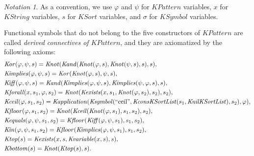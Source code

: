 \documentclass[UTF8,11pt]{article}
\newcounter{thmcounter}
\theoremstyle{plain}
\theoremstyle{definition}
\theoremstyle{remark}
\newtheorem{notation}   [thmcounter]{Notation}
\newcommand{\KString}{\mathit{KString}}
\newcommand{\KSort}{\mathit{KSort}}
\newcommand{\KSymbol}{\mathit{KSymbol}}
\newcommand{\Ksymbol}{\mathit{Ksymbol}}
\newcommand{\KnilKSortList}{\mathit{KnilKSortList}}
\newcommand{\KconsKSortList}{\mathit{KconsKSortList}}
\newcommand{\KPattern}{\mathit{KPattern}}
\newcommand{\Kvariable}{\mathit{Kvariable}}
\newcommand{\Kand}{\mathit{Kand}}
\newcommand{\Kor}{\mathit{Kor}}
\newcommand{\Kimplies}{\mathit{Kimplies}}
\newcommand{\Kiff}{\mathit{Kiff}}
\newcommand{\Knot}{\mathit{Knot}}
\newcommand{\Kapplication}{\mathit{Kapplication}}
\newcommand{\Kexists}{\mathit{Kexists}}
\newcommand{\Kforall}{\mathit{Kforall}}
\newcommand{\Kequals}{\mathit{Kequals}}
\newcommand{\Kin}{\mathit{Kin}}
\newcommand{\Ktop}{\mathit{Ktop}}
\newcommand{\Kbottom}{\mathit{Kbottom}}
\newcommand{\Kfloor}{\mathit{Kfloor}}
\newcommand{\Kceil}{\mathit{Kceil}}
\newcommand{\quot}[1]{\mathrm{``#1"}}
\begin{document}
\begin{notation}\label{notation:variables-about-KPattern}
	As a convention, we use $\varphi$ and $\psi$ for $\KPattern$ variables, $x$ for $\KString$ variables, $s$ for $\KSort$ variables, and $\sigma$ for $\KSymbol$ variables. 
\end{notation}

Functional symbols that do not belong to the five constructors of $\KPattern$ are called \emph{derived connectives of $\KPattern$}, and they are axiomatized by the following axioms:
\begin{align*}
  & \Kor(\varphi, \psi, s) = \Knot(\Kand(\Knot(\varphi, s), \Knot(\psi, s), s), s),
  \\
  & \Kimplies(\varphi, \psi, s) = \Kor(\Knot(\varphi, s), \psi, s),
  \\
  & \Kiff(\varphi, \psi, s) = \Kand(\Kimplies(\varphi, \psi, s), \Kimplies(\psi, \varphi, s), s),
  \\
  & \Kforall(x, s_1, \varphi, s_2) = \Knot(\Kexists(x, s_1, \Knot(\varphi, s_2), s_2), s_2),
  \\
  & \Kceil(\varphi, s_1, s_2) =
    \Kapplication(\Ksymbol(\quot{ceil}, \KconsKSortList(s_1, \KnilKSortList), s_2), \varphi),
  \\
  & \Kfloor(\varphi, s_1, s_2) = \Knot(\Kceil(\Knot(\varphi, s_1), s_1, s_2), s_2),
  \\
  & \Kequals(\varphi, \psi, s_1, s_2) = \Kfloor(\Kiff(\varphi, \psi, s_1), s_1, s_2),
  \\
  & \Kin(\varphi, \psi, s_1, s_2) = \Kfloor(\Kimplies(\varphi, \psi, s_1), s_1, s_2),
  \\
  & \Ktop(s) = \Kexists(x, s, \Kvariable(x, s), s),
  \\
  & \Kbottom(s) = \Knot(\Ktop(s), s).
\end{align*}
\end{document}
